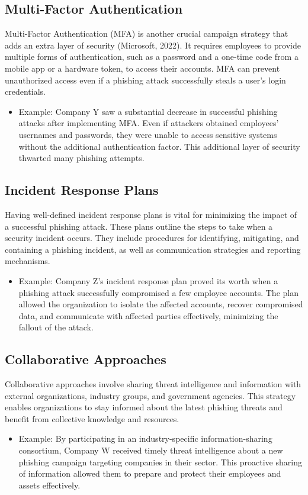 \documentclass[conference]{IEEEtran}
\begin{document}
\subsection{Multi-Factor Authentication}

Multi-Factor Authentication (MFA) is another crucial campaign strategy that adds an extra layer of security (Microsoft, 2022). It requires employees to provide multiple forms of authentication, such as a password and a one-time code from a mobile app or a hardware token, to access their accounts. MFA can prevent unauthorized access even if a phishing attack successfully steals a user's login credentials.
\begin{itemize}
\item Example: Company Y saw a substantial decrease in successful phishing attacks after implementing MFA. Even if attackers obtained employees' usernames and passwords, they were unable to access sensitive systems without the additional authentication factor. This additional layer of security thwarted many phishing attempts.
\end{itemize}

\subsection{Incident Response Plans}

Having well-defined incident response plans is vital for minimizing the impact of a successful phishing attack. These plans outline the steps to take when a security incident occurs. They include procedures for identifying, mitigating, and containing a phishing incident, as well as communication strategies and reporting mechanisms.
\begin{itemize}
\item Example: Company Z's incident response plan proved its worth when a phishing attack successfully compromised a few employee accounts. The plan allowed the organization to isolate the affected accounts, recover compromised data, and communicate with affected parties effectively, minimizing the fallout of the attack.
\end{itemize}

\subsection{Collaborative Approaches}

Collaborative approaches involve sharing threat intelligence and information with external organizations, industry groups, and government agencies. This strategy enables organizations to stay informed about the latest phishing threats and benefit from collective knowledge and resources.
\begin{itemize}
\item Example: By participating in an industry-specific information-sharing consortium, Company W received timely threat intelligence about a new phishing campaign targeting companies in their sector. This proactive sharing of information allowed them to prepare and protect their employees and assets effectively.
\end{itemize}
\end{document}
